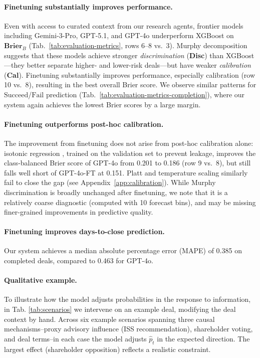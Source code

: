 \documentclass{article}
\theoremstyle{plain}
\theoremstyle{definition}
\theoremstyle{remark}
\newcommand{\Succeed}{\boldsymbol{\mathrm{Succeed}}}
\newcommand{\Fail}{\boldsymbol{\mathrm{Fail}}}
\begin{document}
\paragraph{Finetuning substantially improves performance.}
Even with access to curated context from our research agents, frontier models including Gemini-3-Pro, GPT-5.1, and GPT-4o underperform XGBoost on $\mathbf{Brier}_B$ (Tab.~\ref{tab:evaluation-metrics}, rows 6--8 vs.~3). Murphy decomposition suggests that these models achieve stronger \textit{discrimination} (\textbf{Disc}) than XGBoost---they better separate higher- and lower-risk deals---but have weaker \textit{calibration} (\textbf{Cal}). Finetuning substantially improves performance, especially calibration (row 10 vs.~8), resulting in the best overall Brier score. We observe similar patterns for $\Succeed$/$\Fail$ prediction (Tab.~\ref{tab:evaluation-metrics-completion}), where our system again achieves the lowest Brier scores by a large margin. 

\paragraph{Finetuning outperforms post-hoc calibration.}
The improvement from finetuning does not arise from post-hoc calibration alone: isotonic regression \cite{niculescu2005predicting}, trained on the validation set to prevent leakage, improves the class-balanced Brier score of GPT-4o from 0.201 to 0.186 (row 9 vs.~8), but still falls well short of GPT-4o-FT at 0.151. Platt and temperature scaling similarly fail to close the gap (see Appendix~\ref{app:calibration}). 
While Murphy discrimination is broadly unchanged after finetuning, we note that it is a relatively coarse diagnostic (computed with 10 forecast bins), and may be missing finer-grained improvements in predictive quality. 

\paragraph{Finetuning improves days-to-close prediction.}
Our system achieves a median absolute percentage error (MAPE) of 0.385 on completed deals, compared to 0.463 for GPT-4o.

\paragraph{Qualitative example.}
To illustrate how the model adjusts probabilities in the response to information, in Tab. \ref{tab:scenarios} we intervene on an example deal, modifying the deal context by hand.
Across six example scenarios spanning three causal mechanisms--proxy advisory influence (ISS recommendation), shareholder voting, and deal terms--in each case the model adjusts $\hat{p}_t$ in the expected direction. The largest effect (shareholder opposition) reflects a realistic constraint.
\end{document}
